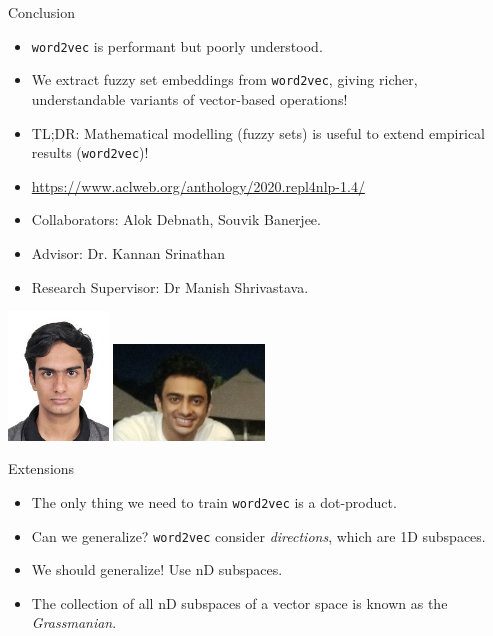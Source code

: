 \documentclass[8pt]{beamer}
\begin{document}
\begin{frame}{Conclusion}
  \begin{itemize}
    \item \texttt{word2vec} is performant but poorly understood.
    \item We extract fuzzy set embeddings from \texttt{word2vec}, giving richer, understandable variants of vector-based operations!
    \item TL;DR: Mathematical modelling (fuzzy sets) is useful to extend empirical results (\texttt{word2vec})!
    \item \url{https://www.aclweb.org/anthology/2020.repl4nlp-1.4/}
    \item Collaborators: Alok Debnath, Souvik Banerjee.
    \item Advisor: Dr. Kannan Srinathan
    \item Research Supervisor: Dr Manish Shrivastava.
  \end{itemize}
  \includegraphics[width=0.2\textwidth]{./alok.jpeg}
  \includegraphics[width=0.3\textwidth]{./souvik.jpg}
\end{frame}


\begin{frame}{Extensions}
  \begin{itemize}
    \item The only thing we need to train \texttt{word2vec} is a dot-product. \pause
    \item Can we generalize? \texttt{word2vec} consider \emph{directions}, which are 1D subspaces. \pause
    \item We should generalize! Use nD subspaces. \pause
    \item The collection of all nD subspaces of a vector space is known as the \emph{Grassmanian}. \pause
  \end{itemize}
\end{frame}
\end{document}
